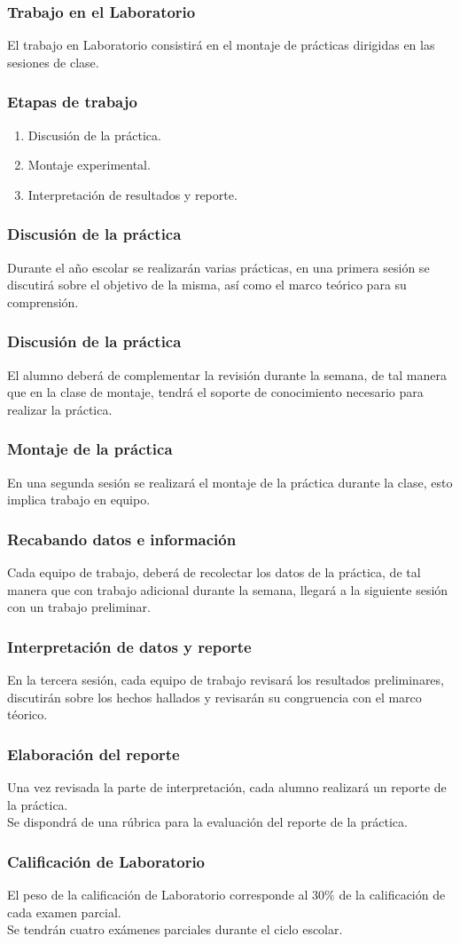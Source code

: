 \documentclass[14pt]{beamer}
\begin{document}
\begin{frame}
\frametitle{Trabajo en el Laboratorio}
El trabajo en Laboratorio consistirá en el montaje de prácticas dirigidas en las sesiones de clase.
\end{frame}
\begin{frame}
\frametitle{Etapas de trabajo}
\begin{enumerate}[<+->]
\item Discusión de la práctica.
\item Montaje experimental.
\item Interpretación de resultados y reporte.
\end{enumerate}
\end{frame}
\begin{frame}
\frametitle{Discusión de la práctica}
Durante el año escolar se realizarán varias prácticas, en una primera sesión se discutirá sobre el objetivo de la misma, así como el marco teórico para su comprensión.
\end{frame}
\begin{frame}
\frametitle{Discusión de la práctica}
El alumno deberá de complementar la revisión durante la semana, de tal manera que en la clase de montaje, tendrá el soporte de conocimiento necesario para realizar la práctica.
\end{frame}
\begin{frame}
\frametitle{Montaje de la práctica}
En una segunda sesión se realizará el montaje de la práctica durante la clase, esto implica trabajo en equipo.
\end{frame}
\begin{frame}
\frametitle{Recabando datos e información}
Cada equipo de trabajo, deberá de recolectar los datos de la práctica, de tal manera que con trabajo adicional durante la semana, llegará a la siguiente sesión con un trabajo preliminar.
\end{frame}
\begin{frame}
\frametitle{Interpretación de datos y reporte}
En la tercera sesión, cada equipo de trabajo revisará los resultados preliminares, discutirán sobre los hechos hallados y revisarán su congruencia con el marco téorico.
\end{frame}
\begin{frame}
\frametitle{Elaboración del reporte}
Una vez revisada la parte de interpretación, cada alumno realizará un reporte de la práctica.
\\
\bigskip
\pause
Se dispondrá de una rúbrica para la evaluación del reporte de la práctica.
\end{frame}
\begin{frame}
\frametitle{Calificación de Laboratorio}
El peso de la calificación de Laboratorio corresponde al $30 \%$ de la calificación de cada examen parcial.
\\
\bigskip
\pause
Se tendrán cuatro exámenes parciales durante el ciclo escolar.
\end{frame}
\end{document}
